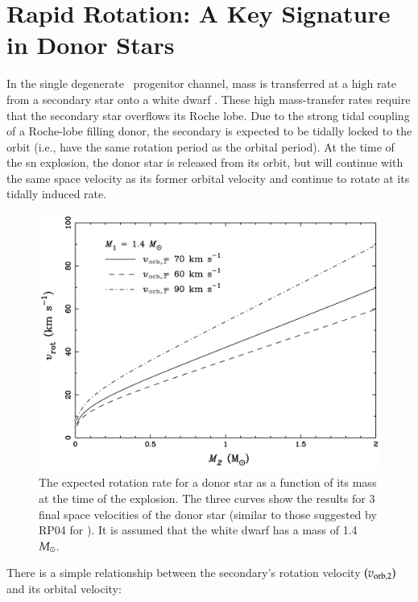 \section{Rapid Rotation: A Key Signature in  Donor Stars}
\label{sec:sn1572_starg_rot}
In the single degenerate \snia\ progenitor channel, mass is transferred
at a high rate from a secondary star onto a white dwarf \citep{Nomoto:1982p451,Nomoto:2007p480}. These high
mass-transfer rates require that the secondary star overflows its
Roche lobe. Due to the strong tidal coupling of a Roche-lobe filling
donor, the secondary is expected to be tidally locked to the orbit
(i.e., have the same rotation period as the orbital period).  At the
time of the \gls*{sn} explosion, the donor star is released from its orbit, but
will continue with the same space velocity as its former orbital
velocity and continue to rotate at its tidally induced rate.

\begin{figure}[tb]
\centering
\includegraphics*[width=\textwidth]{chapter_sn1572_starg/plots/theo_rot_podsi.pdf}
\caption[Expected rotation for Tycho-G]{The expected rotation rate for a donor star as a function of
its mass at the time of the explosion. The three curves show the results for 3 final space
velocities of the donor star (similar to those suggested by RP04 for \starg). It
is assumed that the white dwarf has a mass of 1.4~$\hbox{$M_{\odot}$}$.}
\label{fig:theorot}
\end{figure}

There is a simple relationship between the secondary's rotation
velocity $(v_{\rm orb, 2})$ and its orbital velocity:

